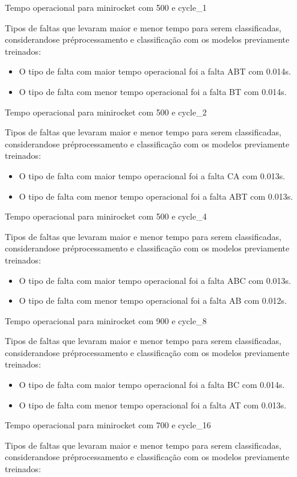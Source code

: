 Tempo operacional para minirocket com 500 e cycle_1
\item Tipos de faltas que levaram maior e menor tempo para serem classificadas, considerando\hyph se pré\hyph processamento e classificação com os modelos previamente treinados:
\begin{itemize}
\item O tipo de falta com maior tempo operacional foi a falta ABT com 0.014s.
\item O tipo de falta com menor tempo operacional foi a falta BT com 0.014s.
\end{itemize}
Tempo operacional para minirocket com 500 e cycle_2
\item Tipos de faltas que levaram maior e menor tempo para serem classificadas, considerando\hyph se pré\hyph processamento e classificação com os modelos previamente treinados:
\begin{itemize}
\item O tipo de falta com maior tempo operacional foi a falta CA com 0.013s.
\item O tipo de falta com menor tempo operacional foi a falta ABT com 0.013s.
\end{itemize}
Tempo operacional para minirocket com 500 e cycle_4
\item Tipos de faltas que levaram maior e menor tempo para serem classificadas, considerando\hyph se pré\hyph processamento e classificação com os modelos previamente treinados:
\begin{itemize}
\item O tipo de falta com maior tempo operacional foi a falta ABC com 0.013s.
\item O tipo de falta com menor tempo operacional foi a falta AB com 0.012s.
\end{itemize}
Tempo operacional para minirocket com 900 e cycle_8
\item Tipos de faltas que levaram maior e menor tempo para serem classificadas, considerando\hyph se pré\hyph processamento e classificação com os modelos previamente treinados:
\begin{itemize}
\item O tipo de falta com maior tempo operacional foi a falta BC com 0.014s.
\item O tipo de falta com menor tempo operacional foi a falta AT com 0.013s.
\end{itemize}
Tempo operacional para minirocket com 700 e cycle_16
\item Tipos de faltas que levaram maior e menor tempo para serem classificadas, considerando\hyph se pré\hyph processamento e classificação com os modelos previamente treinados:
